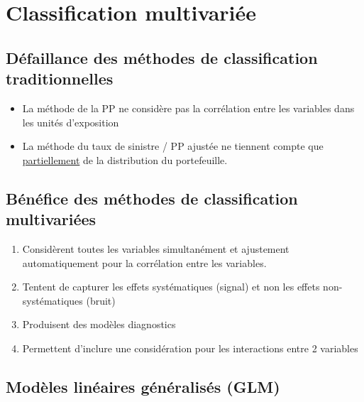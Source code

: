 \section{Classification multivariée}

\subsection{Défaillance des méthodes de classification traditionnelles}
\begin{itemize}
\item La méthode de la PP ne considère pas la corrélation entre les variables dans les unités d'exposition
\item La méthode du taux de sinistre / PP ajustée ne tiennent compte que \underline{partiellement} de la distribution du portefeuille.
\end{itemize}

\subsection{Bénéfice des méthodes de classification multivariées}
\begin{enumerate}
\item Considèrent toutes les variables simultanément et ajustement automatiquement pour la corrélation entre les variables.
\item Tentent de capturer les effets systématiques (signal) et non les effets non-systématiques (bruit)
\item Produisent des modèles diagnostics
\item Permettent d'inclure une considération pour les interactions entre 2 variables
\end{enumerate}

\subsection{Modèles linéaires généralisés (GLM)}

